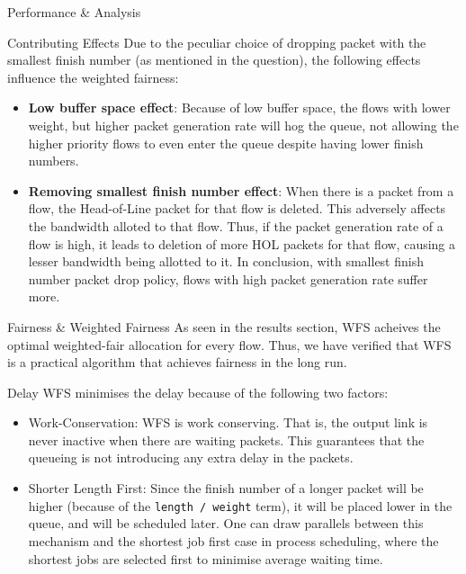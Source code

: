 \begin{section}{Performance \& Analysis}
    \begin{subsection}{Contributing Effects}
        Due to the peculiar choice of dropping packet with the smallest finish number (as mentioned in the question), the following effects influence the weighted fairness:
        \begin{itemize}
            \item \textbf{Low buffer space effect}: Because of low buffer space, the flows with lower weight, but higher packet generation rate will hog the queue, not allowing the higher priority flows to even enter the queue despite having lower finish numbers.
            \item \textbf{Removing smallest finish number effect}: When there is a packet from a flow, the Head-of-Line packet for that flow is deleted. This adversely affects the bandwidth alloted to that flow. Thus, if the packet generation rate of a flow is high, it leads to deletion of more HOL packets for that flow, causing a lesser bandwidth being allotted to it. In conclusion, with smallest finish number packet drop policy, flows with high packet generation rate suffer more. 
        \end{itemize} 
    \end{subsection}

    \begin{subsection}{Fairness \& Weighted Fairness}
        As seen in the results section, WFS acheives the optimal weighted-fair allocation for every flow. Thus, we have verified that WFS is a practical algorithm that achieves fairness in the long run.
    \end{subsection}

    \begin{subsection}{Delay}
        WFS minimises the delay because of the following two factors:
        \begin{itemize}
            \item Work-Conservation: WFS is work conserving. That is, the output link is never inactive when there are waiting packets. This guarantees that the queueing is not introducing any extra delay in the packets.
            \item Shorter Length First: Since the finish number of a longer packet will be higher (because of the \texttt{length / weight} term), it will be placed lower in the queue, and will be scheduled later. One can draw parallels between this mechanism and the shortest job first case in process scheduling, where the shortest jobs are selected first to minimise average waiting time.  
        \end{itemize}
    \end{subsection}


\end{section}
